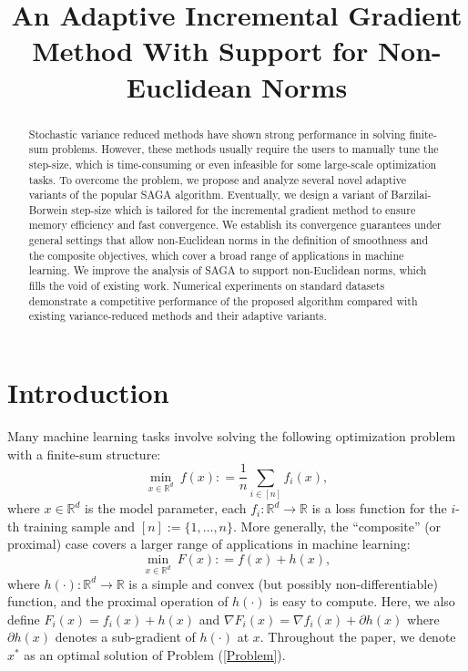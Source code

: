 \documentclass[letterpaper]{article} %
\title{An Adaptive Incremental Gradient Method With Support for Non-Euclidean Norms}
\begin{document}
\maketitle

\begin{abstract}
Stochastic variance reduced methods have shown strong performance in solving finite-sum problems.
%
However, these methods usually require the users to manually tune the step-size, which is time-consuming or even infeasible for some large-scale optimization tasks.
%
To overcome the problem, we propose and analyze several novel adaptive variants of the popular SAGA algorithm.
%
Eventually, we design a variant of Barzilai-Borwein step-size which is tailored for the incremental gradient method to ensure memory efficiency and fast convergence. 
%
We establish its convergence guarantees under general settings that allow non-Euclidean norms in the definition of smoothness and the composite objectives, which cover a broad range of applications in machine learning.
%
We improve the analysis of SAGA to support non-Euclidean norms, which fills the void of existing work.
%
Numerical experiments on standard datasets demonstrate a competitive performance of the proposed algorithm compared with existing variance-reduced methods and their adaptive variants.
\end{abstract}

\section{Introduction}
\label{s:section}
Many machine learning tasks involve solving the following optimization problem with a finite-sum structure:
\begin{equation}\label{problem1}
    \min_{x \in \mathbb{R}^d} \ f(x): = \frac{1}{n}\sum_{i \in [n]}f_i(x),
\end{equation}
where $x\in \mathbb{R}^d$ is the model parameter, each $f_i: \mathbb{R}^d \rightarrow \mathbb{R}$ is a loss function for the $i$-th training sample and $[n]:= \{1,\dots,n\}$.
%
More generally, the ``composite'' (or proximal) case covers a larger range of applications in machine
learning:
\begin{equation}\label{Problem}
    \min_{x \in \mathbb{R}^d} \ F(x) : = f(x) + h(x),
\end{equation}
where $h(\cdot): \mathbb{R}^d \rightarrow \mathbb{R}$ is a simple
and convex (but possibly non-differentiable) function, and the proximal operation of $h(\cdot)$ is easy to compute. %
%
Here, we also define $F_i(x) = f_i(x) + h(x)$ and $\nabla F_i(x) = \nabla f_i(x)+ \partial h(x)$ where $\partial h(x)$ denotes a sub-gradient of $h(\cdot)$ at $x.$
%
Throughout the paper, we denote $x^*$ as an optimal solution of Problem (\ref{Problem}).
\end{document}
